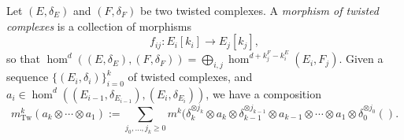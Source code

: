 
 
 
Let $(E, \delta_E)$ and $(F, \delta_F)$ be two twisted complexes. A \emph{morphism of twisted complexes} is a collection of morphisms 
\[f_{ij}:E_i[k_i]\to E_j[k_j],\]
so that $\hom^d((E, \delta_E), (F, \delta_F))=\bigoplus_{i, j}\hom^{d+k^F_j-k^E_i}(E_i, F_j).$
Given a sequence $\{(E_i, \delta_i)\}_{i=0}^k$ of twisted complexes, and $a_i\in\hom^d((E_{i-1}, \delta_{E_{i-1}}), (E_{i}, \delta_{E_{i}}))$, we have a composition 
\[m^k_{\operatorname{Tw}}(a_{k}\otimes \cdots \otimes a_{1} ):=\sum_{j_0, \ldots, j_k\geq 0} m^k(\delta_k^{\otimes j_k}\otimes a_{k}\otimes \delta_{k-1}^{\otimes j_{k-1}}\otimes a_{k-1}\otimes \cdots \otimes a_1\otimes \delta_0^{\otimes j_{0}}().\]

 